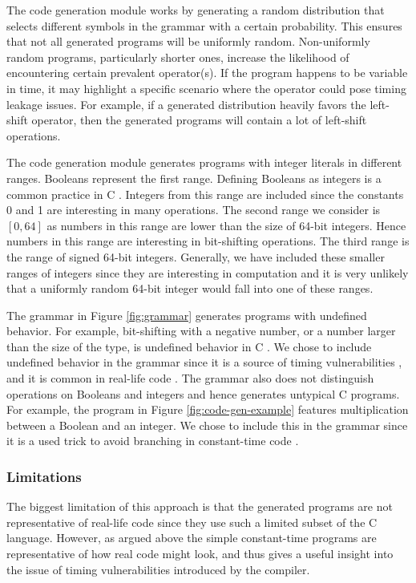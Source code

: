 The code generation module works by generating a random distribution that selects different symbols in the grammar with a certain probability.
This ensures that not all generated programs will be uniformly random. 
Non-uniformly random programs, particularly shorter ones, increase the likelihood of encountering certain prevalent operator(s).
If the program happens to be variable in time, it may highlight a specific scenario where the operator could pose timing leakage issues.
For example, if a generated distribution heavily favors the left-shift operator, then the generated programs will contain a lot of left-shift operations.

The code generation module generates programs with integer literals in different ranges. 
Booleans represent the first range.
Defining Booleans as integers is a common practice in C \citep{c-standard}.
Integers from this range are included since the constants 0 and 1 are interesting in many operations.
The second range we consider is $[0, 64]$ as numbers in this range are lower than the size of 64-bit integers.
Hence numbers in this range are interesting in bit-shifting operations.
The third range is the range of signed 64-bit integers.
Generally, we have included these smaller ranges of integers since they are interesting in computation and it is very unlikely that a uniformly random 64-bit integer would fall into one of these ranges.

The grammar in Figure \ref{fig:grammar} generates programs with undefined behavior.
For example, bit-shifting with a negative number, or a number larger than the size of the type, is undefined behavior in C \citep{c-standard}.
We chose to include undefined behavior in the grammar since it is a source of timing vulnerabilities \citep{what-you-c}, and it is common in real-life code \citep{undefined-behavior-c}.
The grammar also does not distinguish operations on Booleans and integers and hence generates untypical C programs.
For example, the program in Figure \ref{fig:code-gen-example} features multiplication between a Boolean and an integer.
We chose to include this in the grammar since it is a used trick to avoid branching in constant-time code \citep{fact,what-you-c}.

\subsubsection{Limitations}
The biggest limitation of this approach is that the generated programs are not representative of real-life code since they use such a limited subset of the C language.
However, as argued above the simple constant-time programs are representative of how real code might look, and thus gives a useful insight into the issue of timing vulnerabilities introduced by the compiler.